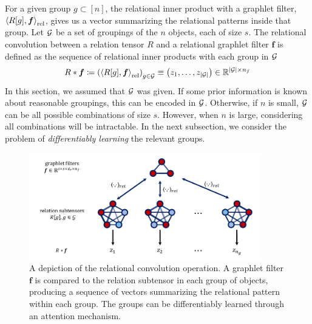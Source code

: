 For a given group $g \subset [n]$, the relational inner product with a graphlet filter, $\left \langle R[g], \bm{f} \right\rangle_\mathrm{rel}$, gives us a vector summarizing the relational patterns inside that group. Let ${\mathcal{G}}$ be a set of groupings of the $n$ objects, each of size $s$. The relational convolution between a relation tensor $R$ and a relational graphlet filter $\bm{f}$ is defined as the sequence of relational inner products with each group in ${\mathcal{G}}$
\begin{equation}\label{eq:relational_convolution}
    R \ast \bm{f} \coloneq \left( \left\langle R[g], \boldsymbol{f} \right\rangle_\mathrm{rel} \right)_{g \in {\mathcal{G}}} \equiv \left(z_1, \ldots, z_{\left\lvert{\mathcal{G}}\right\rvert}\right) \in \mathbb{R}^{\left\lvert{\mathcal{G}}\right\rvert \times n_f}
\end{equation}
In this section, we assumed that ${\mathcal{G}}$ was given.
If some prior information is known about reasonable groupings, this can be encoded in ${\mathcal{G}}$. Otherwise, if $n$ is small, ${\mathcal{G}}$ can be all possible combinations of size $s$. However, when $n$ is large, considering all combinations will be intractable. In the next subsection, we consider the problem of \textit{differentiably learning} the relevant groups.


\begin{figure}[t]
    \centering
    \includegraphics[width=0.9\textwidth]{figs/relconv_figs_updated.pdf}
    \caption{A depiction of the relational convolution operation. A graphlet filter $\bm{f}$ is compared to the relation subtensor in each group of objects, producing a sequence of vectors summarizing the relational pattern within each group. The groups can be differentiably learned through an attention mechanism.
    }\label{fig:relconvdiagram}
    \vskip-7.5pt
\end{figure}

